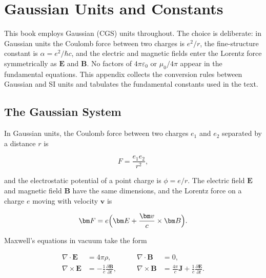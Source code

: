 \chapter{Gaussian Units and Constants}

\begin{note}
This book employs Gaussian (CGS) units throughout. The choice is deliberate: in Gaussian units the Coulomb force between two charges is $e^2/r$, the fine-structure constant is $\alpha = e^2/\hbar c$, and the electric and magnetic fields enter the Lorentz force symmetrically as $\bm E$ and $\bm B$. No factors of $4\pi\varepsilon_0$ or $\mu_0/4\pi$ appear in the fundamental equations. This appendix collects the conversion rules between Gaussian and SI units and tabulates the fundamental constants used in the text.
\end{note}

\section{The Gaussian System}
\label{sec:gaussian-system}

In Gaussian units, the Coulomb force between two charges $e_1$ and $e_2$ separated by a distance $r$ is
\begin{linenomath}
    \begin{equation}
        F = \frac{e_1 e_2}{r^2},
        \label{eq:coulomb-gaussian}
    \end{equation}
\end{linenomath}
and the electrostatic potential of a point charge is $\phi = e/r$. The electric field $\bm E$ and magnetic field $\bm B$ have the same dimensions, and the Lorentz force on a charge $e$ moving with velocity $\bm v$ is
\begin{linenomath}
    \begin{equation}
        \bm F = e\Bigl(\bm E + \frac{\bm v}{c} \times \bm B\Bigr).
        \label{eq:lorentz-gaussian}
    \end{equation}
\end{linenomath}
Maxwell's equations in vacuum take the form
\begin{linenomath}
    \begin{align}
        \nabla \cdot \bm E &= 4\pi\rho, \qquad &
        \nabla \cdot \bm B &= 0, \nonumber\\
        \nabla \times \bm E &= -\frac{1}{c}\frac{\partial\bm B}{\partial t}, \qquad &
        \nabla \times \bm B &= \frac{4\pi}{c}\bm J + \frac{1}{c}\frac{\partial\bm E}{\partial t}.
        \label{eq:maxwell-gaussian}
    \end{align}
\end{linenomath}

